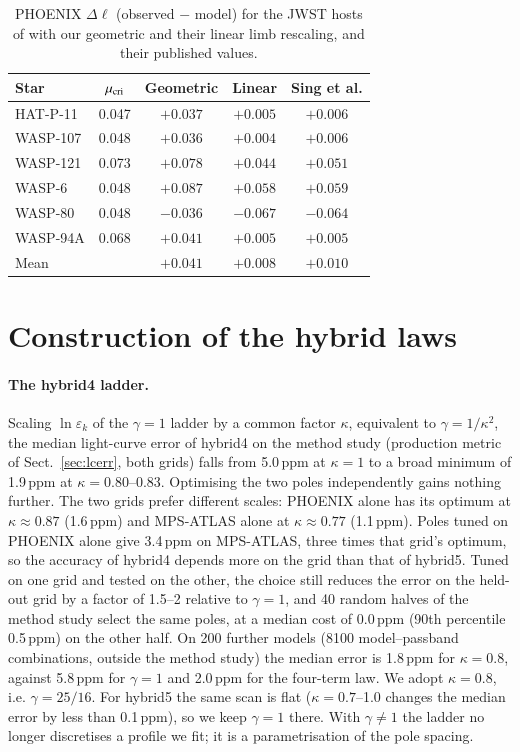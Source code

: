 \documentclass{aa}
\newcommand{\ppm}{\,\textrm{ppm}}
\begin{document}
\begin{appendix}
\begin{table}
\caption{PHOENIX $\Delta\ell$ (observed $-$ model) for the JWST hosts of
\citet{sing2026} with our geometric and their linear limb rescaling, and their
published values.}
\label{tab:sing}
\centering
\begin{tabular}{lcccc}
\hline\hline
Star & $\mu_{\rm cri}$ & Geometric & Linear & Sing et al.\\
\hline
HAT-P-11 & 0.047 & $+0.037$ & $+0.005$ & $+0.006$\\
WASP-107 & 0.048 & $+0.036$ & $+0.004$ & $+0.006$\\
WASP-121 & 0.073 & $+0.078$ & $+0.044$ & $+0.051$\\
WASP-6 & 0.048 & $+0.087$ & $+0.058$ & $+0.059$\\
WASP-80 & 0.048 & $-0.036$ & $-0.067$ & $-0.064$\\
WASP-94A & 0.068 & $+0.041$ & $+0.005$ & $+0.005$\\
\hline
Mean & & $+0.041$ & $+0.008$ & $+0.010$\\
\hline
\end{tabular}
\end{table}

\section{Construction of the hybrid laws}\label{app:laws}
\paragraph{The hybrid4 ladder.} Scaling $\ln\varepsilon_k$ of the
$\gamma=1$ ladder by a common factor $\kappa$, equivalent to
$\gamma=1/\kappa^2$, the median light-curve error of hybrid4 on the method
study (production metric of Sect.~\ref{sec:lcerr}, both grids) falls from
5.0\ppm{} at $\kappa=1$ to a broad minimum of 1.9\ppm{} at
$\kappa=0.80$--0.83. Optimising the two poles independently gains nothing
further. The two grids prefer different scales: PHOENIX alone has its optimum
at $\kappa\approx0.87$ (1.6\ppm) and MPS-ATLAS alone at $\kappa\approx0.77$
(1.1\ppm). Poles tuned on PHOENIX alone give 3.4\ppm{} on MPS-ATLAS, three
times that grid's optimum, so the accuracy of hybrid4 depends more on the grid
than that of hybrid5. Tuned on one grid and tested on the other, the choice
still reduces the error on the held-out grid by a factor of 1.5--2 relative to
$\gamma=1$, and 40 random halves of the method study select the same poles,
at a median cost of 0.0\ppm{} (90th percentile 0.5\ppm) on the other half.
On 200 further models (8100 model--passband combinations, outside the method
study) the median error is 1.8\ppm{} for $\kappa=0.8$, against 5.8\ppm{} for
$\gamma=1$ and 2.0\ppm{} for the four-term law. We adopt $\kappa=0.8$, i.e.
$\gamma=25/16$. For hybrid5 the same scan is flat ($\kappa=0.7$--1.0 changes
the median error by less than 0.1\ppm), so we keep $\gamma=1$ there. With
$\gamma\ne1$ the ladder no longer discretises a profile we fit; it is a
parametrisation of the pole spacing.


\end{appendix}
\end{document}
